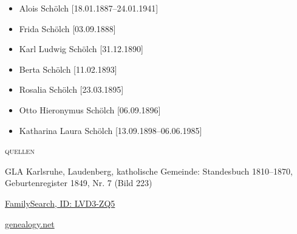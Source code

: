 \begin{person}[
    surname = {Schölch},
    givenname = {Ludwig},
    suffix = {1849},
    label = {@I225@},
    filename = {Ludwig Schölch (1849)}
    ]
\begin{itemize}
\item Alois Schölch [18.01.1887--24.01.1941]
\item Frida Schölch [03.09.1888]
\item Karl Ludwig Schölch [31.12.1890]
\item Berta Schölch [11.02.1893]
\item Rosalia Schölch [23.03.1895]
\item Otto Hieronymus Schölch [06.09.1896]
\item Katharina Laura Schölch [13.09.1898--06.06.1985]
\end{itemize}
\medbreak
\textsc{{quellen}}
\begin{enumerate}[label={[\arabic*]}]
\item GLA Karlsruhe, Laudenberg, katholische Gemeinde: Standesbuch 1810–1870, Geburtenregister 1849, Nr. 7 (Bild 223)
\item \href{https://www.familysearch.org/tree/person/details/LVD3-ZQ5}{FamilySearch, ID: LVD3-ZQ5}
\item \href{http://gedbas.genealogy.net/person/show/1172960830}{genealogy.net}
\end{enumerate}

\end{person}

